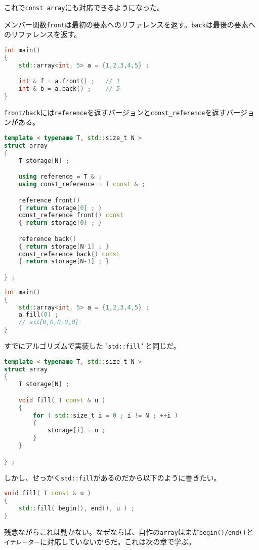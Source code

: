 これで\texttt{const array}にも対応できるようになった。

\clearpage
{}

メンバー関数\texttt{front}は最初の要素へのリファレンスを返す。\texttt{back}は最後の要素へのリファレンスを返す。

\begin{lstlisting}[language={C++}]
int main()
{
    std::array<int, 5> a = {1,2,3,4,5} ;

    int & f = a.front() ;   // 1
    int & b = a.back() ;    // 5
}
\end{lstlisting}

\texttt{front/back}には\texttt{reference}を返すバージョンと\texttt{const\_reference}を返すバージョンがある。

\begin{lstlisting}[language={C++}]
template < typename T, std::size_t N >
struct array
{
    T storage[N] ;

    using reference = T & ;
    using const_reference = T const & ;

    reference front()
    { return storage[0] ; }
    const_reference front() const
    { return storage[0] ; }

    reference back()
    { return storage[N-1] ; }
    const_reference back() const
    { return storage[N-1] ; }

} ;
\end{lstlisting}

\clearpage
{}

\begin{lstlisting}[language={C++}]
int main()
{
    std::array<int, 5> a = {1,2,3,4,5} ;
    a.fill(0) ;
    // aは{0,0,0,0,0}
}
\end{lstlisting}

すでにアルゴリズムで実装した\,\texttt{'std::fill'}\,と同じだ。

\begin{lstlisting}[language={C++}]
template < typename T, std::size_t N >
struct array
{
    T storage[N] ;

    void fill( T const & u )
    {
        for ( std::size_t i = 0 ; i != N ; ++i )
        {
            storage[i] = u ;
        }
    }

} ;
\end{lstlisting}

しかし、せっかく\texttt{std::fill}があるのだから以下のように書きたい。

\begin{lstlisting}[language={C++}]
void fill( T const & u )
{
    std::fill( begin(), end(), u ) ;
}
\end{lstlisting}

残念ながらこれは動かない。なぜならば、自作の\texttt{array}はまだ\texttt{begin()/end()}と\texttt{イテレーター}に対応していないからだ。これは次の章で学ぶ。
